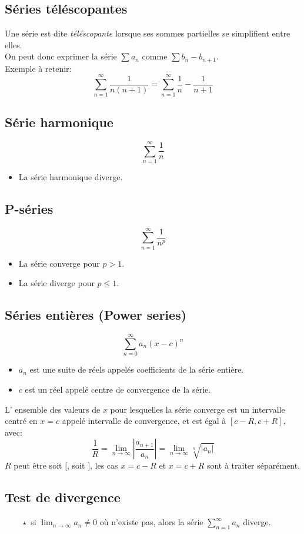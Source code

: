 \subsection{Séries téléscopantes}
Une série est dite  \emph{téléscopante} lorsque ses sommes partielles se simplifient entre elles.\\
On peut donc exprimer la série $\sum a_n$ comme $\sum b_n - b_{n+1}$.\\
Exemple à retenir:
\[\sum_{n = 1}^{\infty} \frac{1}{n(n + 1)} = \sum_{n =1}^{\infty} \frac{1}{n} - \frac{1}{n + 1}\]
\subsection{Série harmonique}
\[\sum_{n = 1}^{\infty} \frac{1}{n}\]
\begin{itemize}
\item La série harmonique diverge.
\end{itemize}

\subsection{P-séries}
\[\sum_{n = 1}^{\infty} \frac{1}{n^p}\]
\begin{itemize}
\item La série converge pour $p > 1$.
\item La série diverge pour $p \leq 1$.
\end{itemize}

\subsection{Séries entières (Power series)}
\[\sum_{n =0}^{\infty}  a_n(x - c)^n\]
\begin{itemize}
\item $a_n$ est une suite de réels appelés coefficients de la série entière.
\item $c$ est un réel appelé centre de convergence de la série.
\end{itemize}
L' ensemble des valeurs de $x$ pour lesquelles la série converge est un intervalle centré en $x = c$ appelé intervalle de convergence,
 et est égal à $[c - R, c + R]$, avec:
\[\frac{1}{R} = \lim_{n \to \infty} \left| \frac{a_{n + 1}}{a_n} \right| = \lim_{n \to \infty} \sqrt[n]{|a_n|}\]
$R$ peut être soit $[$, soit $]$, les cas $x = c - R$ et $x = c + R$ sont à traiter séparément.
\subsection{Test de divergence}
$\qquad \star$ si $\lim_{n \to \infty}a_n \neq 0$ où n'existe pas, alors la série $\sum_{n = 1}^{\infty}a_n$  diverge.
